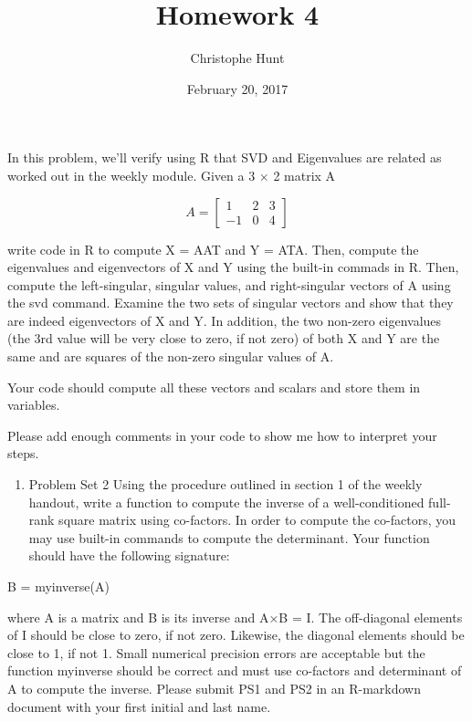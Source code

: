 \documentclass[]{article}
\title{Homework 4}
\author{Christophe Hunt}
\date{February 20, 2017}
\providecommand{\tightlist}{%
  \setlength{\itemsep}{0pt}\setlength{\parskip}{0pt}}
\begin{document}
\maketitle

{
\setcounter{tocdepth}{2}
\tableofcontents
}
In this problem, we'll verify using R that SVD and Eigenvalues are
related as worked out in the weekly module. Given a 3 × 2 matrix A

\[
A = \begin{bmatrix}
    1 & 2 & 3 \\
   -1 & 0 & 4 
\end{bmatrix}
\]

write code in R to compute X = AAT and Y = ATA. Then, compute the
eigenvalues and eigenvectors of X and Y using the built-in commads in R.
Then, compute the left-singular, singular values, and right-singular
vectors of A using the svd command. Examine the two sets of singular
vectors and show that they are indeed eigenvectors of X and Y. In
addition, the two non-zero eigenvalues (the 3rd value will be very close
to zero, if not zero) of both X and Y are the same and are squares of
the non-zero singular values of A.

Your code should compute all these vectors and scalars and store them in
variables.

Please add enough comments in your code to show me how to interpret your
steps.

\begin{enumerate}
\def\labelenumi{\arabic{enumi}.}
\setcounter{enumi}{1}
\tightlist
\item
  Problem Set 2 Using the procedure outlined in section 1 of the weekly
  handout, write a function to compute the inverse of a well-conditioned
  full-rank square matrix using co-factors. In order to compute the
  co-factors, you may use built-in commands to compute the determinant.
  Your function should have the following signature:
\end{enumerate}

B = myinverse(A)

where A is a matrix and B is its inverse and A×B = I. The off-diagonal
elements of I should be close to zero, if not zero. Likewise, the
diagonal elements should be close to 1, if not 1. Small numerical
precision errors are acceptable but the function myinverse should be
correct and must use co-factors and determinant of A to compute the
inverse. Please submit PS1 and PS2 in an R-markdown document with your
first initial and last name.
\end{document}
